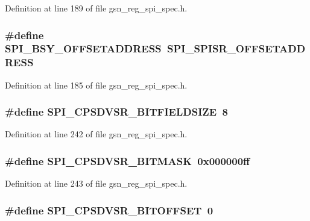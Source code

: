 Definition at line 189 of file gsn\_\-reg\_\-spi\_\-spec.h.

\hypertarget{a00573_a95a47cdeb59f8a7d9ea5c87499f13acb}{
\subsubsection[{SPI\_\-BSY\_\-OFFSETADDRESS}]{\setlength{\rightskip}{0pt plus 5cm}\#define SPI\_\-BSY\_\-OFFSETADDRESS~SPI\_\-SPISR\_\-OFFSETADDRESS}}
\label{a00573_a95a47cdeb59f8a7d9ea5c87499f13acb}


Definition at line 185 of file gsn\_\-reg\_\-spi\_\-spec.h.

\hypertarget{a00573_a176e329104fe39336c062d48d464ee47}{
\subsubsection[{SPI\_\-CPSDVSR\_\-BITFIELDSIZE}]{\setlength{\rightskip}{0pt plus 5cm}\#define SPI\_\-CPSDVSR\_\-BITFIELDSIZE~8}}
\label{a00573_a176e329104fe39336c062d48d464ee47}


Definition at line 242 of file gsn\_\-reg\_\-spi\_\-spec.h.

\hypertarget{a00573_a458127b1e341e4fa1258cc48117154f7}{
\subsubsection[{SPI\_\-CPSDVSR\_\-BITMASK}]{\setlength{\rightskip}{0pt plus 5cm}\#define SPI\_\-CPSDVSR\_\-BITMASK~0x000000ff}}
\label{a00573_a458127b1e341e4fa1258cc48117154f7}


Definition at line 243 of file gsn\_\-reg\_\-spi\_\-spec.h.

\hypertarget{a00573_aa9a1b4fe02bbf65f92572ceb8c40ba94}{
\subsubsection[{SPI\_\-CPSDVSR\_\-BITOFFSET}]{\setlength{\rightskip}{0pt plus 5cm}\#define SPI\_\-CPSDVSR\_\-BITOFFSET~0}}
\label{a00573_aa9a1b4fe02bbf65f92572ceb8c40ba94}


